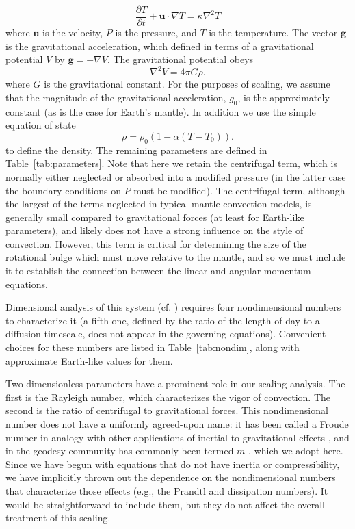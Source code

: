 \documentclass[preprint,12pt,authoryear]{elsarticle}
\begin{document}
\begin{equation}
\frac{\partial T}{\partial t} + \mathbf{u} \cdot \nabla T = \kappa \nabla^2 T
\label{eq:energy}
\end{equation}
where $\mathbf{u}$ is the velocity, $P$ is the pressure, and $T$ is the temperature.
The vector $\mathbf{g}$ is the gravitational acceleration, 
which defined in terms of a gravitational potential $V$ by $\mathbf{g} = -\nabla V$. 
The gravitational potential obeys 
\begin{equation}
\nabla^2 V = 4 \pi G \rho.
\end{equation}
where $G$ is the gravitational constant. 
For the purposes of scaling, we assume that the magnitude of the gravitational acceleration, $g_0$, is the approximately constant (as is the case for Earth's mantle).
In addition we use the simple equation of state
\begin{equation}
\rho = \rho_0 \left( 1 - \alpha (T-T_0) \right).
\label{eq:eos}
\end{equation}
to define the density.
The remaining parameters are defined in Table~\ref{tab:parameters}.
Note that here we retain the centrifugal term, which is normally either neglected or absorbed into a modified pressure
(in the latter case the boundary conditions on $P$ must be modified).
The centrifugal term, although the largest of the terms neglected in typical mantle convection models,
is generally small compared to gravitational forces (at least for Earth-like parameters),
and likely does not have a strong influence on the style of convection.
However, this term is critical for determining the size of the rotational bulge which must move relative to the mantle,
and so we must include it to establish the connection between the linear and angular momentum equations.

Dimensional analysis of this system (cf. \citet{barenblatt1996scaling}) requires four nondimensional numbers to characterize it
(a fifth one, defined by the ratio of the length of day to a diffusion timescale, does not appear in the governing equations).
Convenient choices for these numbers are listed in Table~\ref{tab:nondim}, along with approximate Earth-like values for them.

Two dimensionless parameters have a prominent role in our scaling analysis. 
The first is the Rayleigh number, which characterizes the  vigor of convection. 
The second is the ratio of centrifugal to gravitational forces.
This nondimensional number does not have a uniformly agreed-upon name: 
it has been called a Froude number in analogy with other applications of inertial-to-gravitational effects \citep{mckenzie1968influence}, 
and in the geodesy community has commonly been termed $m$ \citep[e.g.][]{nakiboglu1982hydrostatic, chambat2010flattening}, which we adopt here.
Since we have begun with equations that do not have inertia or compressibility, we have implicitly thrown out the dependence on the nondimensional numbers that characterize those effects (e.g., the Prandtl and dissipation numbers).
It would be straightforward to include them, but they do not affect the overall treatment of this scaling.
\end{document}
